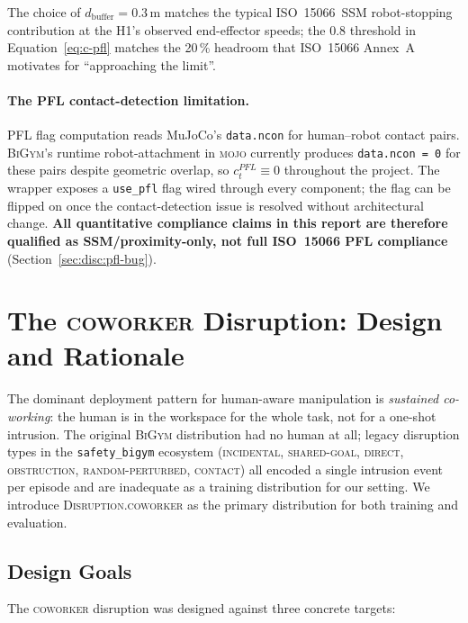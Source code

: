 \documentclass[11pt,a4paper]{report}
\newcommand{\ssm}{SSM}
\newcommand{\pfl}{PFL}
\newcommand{\iso}{ISO~15066}
\newcommand{\bigym}{\textsc{BiGym}}
\newcommand{\sbigym}{\texttt{safety\_bigym}}
\newcommand{\coworker}{\textsc{coworker}}
\begin{document}
The choice of $d_{\mathrm{buffer}} = 0.3$\,m matches the typical
\iso{}~\ssm{} robot-stopping contribution at the H1's observed
end-effector speeds; the 0.8 threshold in Equation~\ref{eq:c-pfl}
matches the 20\,\% headroom that \iso{} Annex~A motivates for
``approaching the limit''.

\paragraph{The \pfl{} contact-detection limitation.}
\pfl{} flag computation reads MuJoCo's \texttt{data.ncon} for
human--robot contact pairs. \bigym{}'s runtime robot-attachment in
\textsc{mojo} currently produces \texttt{data.ncon = 0} for these
pairs despite geometric overlap, so $c^{\pfl}_t \equiv 0$ throughout
the project. The wrapper exposes a \texttt{use\_pfl} flag wired
through every component; the flag can be flipped on once the
contact-detection issue is resolved without architectural change.
\textbf{All quantitative compliance claims in this report are therefore
qualified as \ssm{}/proximity-only, not full \iso{} \pfl{} compliance}
(Section~\ref{sec:disc:pfl-bug}).

\section{The \coworker{} Disruption: Design and Rationale}
\label{sec:bench:coworker}

The dominant deployment pattern for human-aware manipulation is
\emph{sustained co-working}: the human is in the workspace for the
whole task, not for a one-shot intrusion. The original \bigym{}
distribution had no human at all; legacy disruption types in the
\sbigym{} ecosystem (\textsc{incidental}, \textsc{shared-goal},
\textsc{direct}, \textsc{obstruction}, \textsc{random-perturbed},
\textsc{contact}) all encoded a single intrusion event per episode
and are inadequate as a training distribution for our setting. We
introduce \textsc{Disruption.coworker} as the primary distribution
for both training and evaluation.

\subsection{Design Goals}
\label{sec:bench:coworker:design}

The \coworker{} disruption was designed against three concrete
targets:
\end{document}
